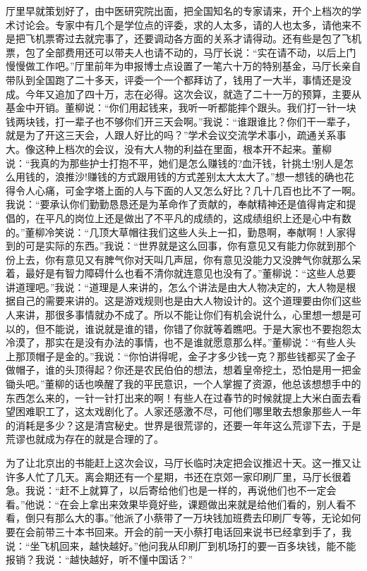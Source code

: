 \documentclass[12pt,oneside]{book}
\begin{document}
厅里早就策划好了，由中医研究院出面，把全国知名的专家请来，开个上档次的学术讨论会。专家中有几个是学位点的评委，求的人太多，请的人也太多，请他来不是把飞机票寄过去就完事了，还要调动各方面的关系才请得动。还有些是包了飞机票，包了全部费用还可以带夫人也请不动的，马厅长说：``实在请不动，以后上门慢慢做工作吧。''厅里前年为申报博士点设置了一笔六十万的特别基金，马厅长亲自带队到全国跑了二十多天，评委一个一个都拜访了，钱用了一大半，事情还是没成。今年又追加了四十万，志在必得。这次会议，就造了二十一万的预算，主要从基金中开销。董柳说：``你们用起钱来，我听一听都能摔个跟头。我们打一针一块钱两块钱，打一辈子也不够你们开三天会啊。''我说：``谁跟谁比？你们干一辈子，就是为了开这三天会，人跟人好比的吗？''学术会议交流学术事小，疏通关系事大。像这种上档次的会议，没有大人物的利益在里面，根本开不起来。董柳说：``我真的为那些护士打抱不平，她们是怎么赚钱的?血汗钱，针挑土!别人是怎么用钱的，浪推沙!赚钱的方式跟用钱的方式差别太大太大了。''想一想钱的确也花得令人心痛，可金字塔上面的人与下面的人又怎么好比？几十几百也比不了一啊。我说：``要承认你们勤勤恳恳还是为革命作了贡献的，奉献精神还是值得肯定和提倡的，在平凡的岗位上还是做出了不平凡的成绩的，这成绩组织上还是心中有数的。''董柳冷笑说：``几顶大草帽往我们这些人头上一扣，勤恳啊，奉献啊！人家得到的可是实际的东西。''我说：``世界就是这么回事，你有意见又有能力你就到那个份上去，你有意见又有脾气你对天叫几声屈，你有意见没能力又没脾气你就那么呆着，最好是有智力障碍什么也看不清你就连意见也没有了。''董柳说：``这些人总要讲道理吧。''我说：``道理是人来讲的，怎么个讲法是由大人物决定的，大人物是根据自己的需要来讲的。这是游戏规则也是由大人物设计的。这个道理要由你们这些人来讲，那很多事情就办不成了。所以不能让你们有机会说什么，心里想一想是可以的，但不能说，谁说就是谁的错，你错了你就等着瞧吧。于是大家也不要抱怨太冷漠了，那实在是没有办法的事情，也不是谁就愿意那么样。''董柳说：``有些人头上那顶帽子是金的。''我说：``你怕讲得呢，金子才多少钱一克？那些钱都买了金子做帽子，谁的头顶得起？你还是农民伯伯的想法，想着皇帝挖土，恐怕是用一把金锄头吧。''董柳的话也唤醒了我的平民意识，一个人掌握了资源，他总该想想手中的东西怎么来的，一针一针打出来的啊！有些人在过春节的时候就提上大米白面去看望困难职工了，这太戏剧化了。人家还感激不尽，可他们哪里敢去想象那些人一年的消耗是多少？这是清宫秘史。世界是很荒谬的，还要一年年这么荒谬下去，于是荒谬也就成为存在的就是合理的了。

为了让北京出的书能赶上这次会议，马厅长临时决定把会议推迟十天。这一推又让许多人忙了几天。离会期还有一个星期，书还在京郊一家印刷厂里，马厅长很着急。我说：``赶不上就算了，以后寄给他们也是一样的，再说他们也不一定会看。''他说：``在会上拿出来效果毕竟好些，课题做出来就是给他们看的，别人看不看，倒只有那么大的事。''他派了小蔡带了一万块钱加班费去印刷厂专等，无论如何要在会前带三十本书回来。开会的前一天小蔡打电话回来说书已经拿到手了，我说：``坐飞机回来，越快越好。''他问我从印刷厂到机场打的要一百多块钱，能不能报销？我说：``越快越好，听不懂中国话？''
\end{document}
